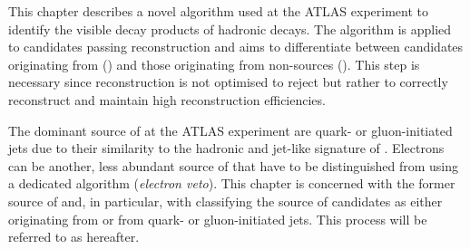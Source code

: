 This chapter describes a novel algorithm used at the ATLAS experiment to
identify the visible decay products of hadronic \taulepton decays. The algorithm
is applied to \tauhadvis candidates passing \tauhadvis reconstruction and aims
to differentiate between candidates originating from \tauhad (\truetauhadvis)
and those originating from non-\tauhad sources (\faketauhadvis). This step is
necessary since \tauhadvis reconstruction is not optimised to reject
\faketauhadvis but rather to correctly reconstruct \truetauhadvis and maintain
high \tauhadvis reconstruction efficiencies.

The dominant source of \faketauhadvis at the ATLAS experiment are quark- or
gluon-initiated jets due to their similarity to the hadronic and jet-like
signature of \tauhadvis. Electrons can be another, less abundant source of
\faketauhadvis that have to be distinguished from \truetauhadvis using a
dedicated algorithm (\emph{electron veto}). This chapter is concerned with the
former source of \faketauhadvis and, in particular, with classifying the source
of \tauhadvis candidates as either originating from \tauhad or from quark- or
gluon-initiated jets. This process will be referred to as \tauid hereafter.

